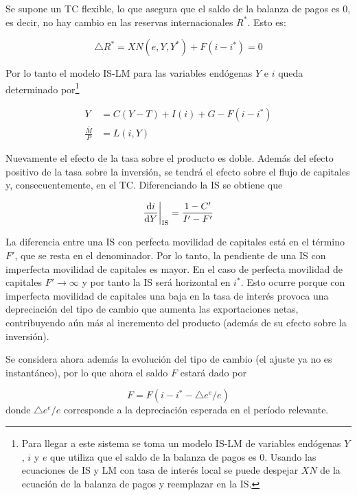 \documentclass[DeGregorioResumen]{subfiles}
\begin{document}
Se supone un TC flexible, lo que asegura que el saldo de la balanza de pagos es 0, es decir, no hay cambio en las reservas internacionales $R^*$. Esto es:

\begin{equation}
	\bigtriangleup R^* = XN(e, Y, Y^*) + F(i-i^*)=0
	\label{eq:20-BP_balanceada}
\end{equation}

Por lo tanto el modelo IS-LM para las variables endógenas $Y$ e $i$ queda determinado por\footnote{Para llegar a este sistema se toma un modelo IS-LM de variables endógenas $Y$, $i$ y $e$ 	que utiliza que el saldo de la balanza de pagos es 0. Usando las ecuaciones de IS y LM con tasa de interés local se puede despejar $XN$ de la ecuación de la balanza de pagos y reemplazar en la IS.}

\begin{align}
	Y &= C(Y-T) + I(i) + G - F(i-i^*) \\
	\frac{\overline M}{P} &= L(i, Y)
\end{align}

Nuevamente el efecto de la tasa sobre el producto es doble. Además del efecto positivo de la tasa sobre la inversión, se tendrá el efecto sobre el flujo de capitales y, consecuentemente, en el TC. Diferenciando la IS se obtiene que

\begin{equation*}
	\frac{\mathrm{d}i}{\mathrm{d}Y} \bigg |_{\text{IS}} = \frac{1-C'}{I'-F'}
\end{equation*}

La diferencia entre una IS con perfecta movilidad de capitales está en el término $F'$, que se resta en el denominador. Por lo tanto, la pendiente de una IS con imperfecta movilidad de capitales es mayor. En el caso de perfecta movilidad de capitales $F' \rightarrow \infty$ y por tanto la IS será horizontal en $i^*$. Esto ocurre porque con imperfecta movilidad de capitales una baja en la tasa de interés provoca una depreciación del tipo de cambio que aumenta las exportaciones netas, contribuyendo aún más al incremento del producto (además de su efecto sobre la inversión).

Se considera ahora además la evolución del tipo de cambio (el ajuste ya no es instantáneo), por lo que ahora el saldo $F$ estará dado por

\begin{equation*}
	F = F(i-i^*-\bigtriangleup e^e/e)
\end{equation*}
donde $\bigtriangleup e^e/e$ corresponde a la depreciación esperada en el período relevante.
\end{document}
